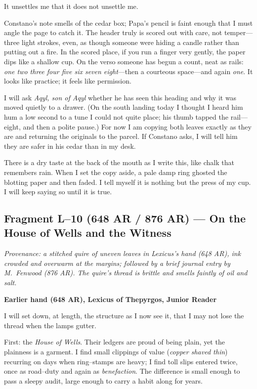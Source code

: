 \documentclass[11pt]{article}
\begin{document}
It unsettles me that it does not unsettle me.

Constano’s note smells of the cedar box; Papa’s pencil is faint enough that I must angle the page to catch it. The header truly is scored out with care, not temper—three light strokes, even, as though someone were hiding a candle rather than putting out a fire. In the scored place, if you run a finger very gently, the paper dips like a shallow cup. On the verso someone has begun a count, neat as rails: \emph{one two three four five six seven eight}—then a courteous space—and again \emph{one}. It looks like practice; it feels like permission.

I will ask \textit{Aqyl, son of Aqyl} whether he has seen this heading and why it was moved quietly to a drawer. (On the south landing today I thought I heard him hum a low second to a tune I could not quite place; his thumb tapped the rail—eight, and then a polite pause.) For now I am copying both leaves exactly as they are and returning the originals to the parcel. If Constano asks, I will tell him they are safer in his cedar than in my desk.

There is a dry taste at the back of the mouth as I write this, like chalk that remembers rain. When I set the copy aside, a pale damp ring ghosted the blotting paper and then faded. I tell myself it is nothing but the press of my cup. I will keep saying so until it is true.

\subsection{Fragment L--10 (648 AR / 876 AR) — On the House of Wells and the Witness}
\label{frag:l10}

\noindent\textit{Provenance: a stitched quire of uneven leaves in Lexicus’s hand (648 AR), ink crowded and overwarm at the margins; followed by a brief journal entry by M.\ Fenwood (876 AR). The quire’s thread is brittle and smells faintly of oil and salt.}

\medskip
\noindent\textbf{Earlier hand (648 AR), Lexicus of Thepyrgos, Junior Reader}

I will set down, at length, the structure as I now see it, that I may not lose the thread when the lamps gutter.

First: the \textit{House of Wells}. Their ledgers are proud of being plain, yet the plainness is a garment. I find small clippings of value (\emph{copper shaved thin}) recurring on days when ring–stamps are heavy; I find toll slips entered twice, once as road–duty and again as \emph{benefaction}. The difference is small enough to pass a sleepy audit, large enough to carry a habit along for years.
\end{document}
